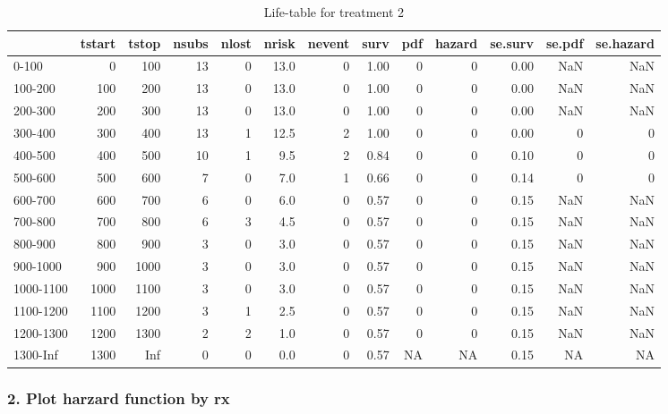 \documentclass[
]{article}
\begin{document}
\begin{table}

\caption{\label{tab:unnamed-chunk-2}Life-table for treatment 2}
\centering
\begin{tabular}[t]{l|r|r|r|r|r|r|r|r|r|r|r|r}
\hline
  & tstart & tstop & nsubs & nlost & nrisk & nevent & surv & pdf & hazard & se.surv & se.pdf & se.hazard\\
\hline
0-100 & 0 & 100 & 13 & 0 & 13.0 & 0 & 1.00 & 0 & 0 & 0.00 & NaN & NaN\\
\hline
100-200 & 100 & 200 & 13 & 0 & 13.0 & 0 & 1.00 & 0 & 0 & 0.00 & NaN & NaN\\
\hline
200-300 & 200 & 300 & 13 & 0 & 13.0 & 0 & 1.00 & 0 & 0 & 0.00 & NaN & NaN\\
\hline
300-400 & 300 & 400 & 13 & 1 & 12.5 & 2 & 1.00 & 0 & 0 & 0.00 & 0 & 0\\
\hline
400-500 & 400 & 500 & 10 & 1 & 9.5 & 2 & 0.84 & 0 & 0 & 0.10 & 0 & 0\\
\hline
500-600 & 500 & 600 & 7 & 0 & 7.0 & 1 & 0.66 & 0 & 0 & 0.14 & 0 & 0\\
\hline
600-700 & 600 & 700 & 6 & 0 & 6.0 & 0 & 0.57 & 0 & 0 & 0.15 & NaN & NaN\\
\hline
700-800 & 700 & 800 & 6 & 3 & 4.5 & 0 & 0.57 & 0 & 0 & 0.15 & NaN & NaN\\
\hline
800-900 & 800 & 900 & 3 & 0 & 3.0 & 0 & 0.57 & 0 & 0 & 0.15 & NaN & NaN\\
\hline
900-1000 & 900 & 1000 & 3 & 0 & 3.0 & 0 & 0.57 & 0 & 0 & 0.15 & NaN & NaN\\
\hline
1000-1100 & 1000 & 1100 & 3 & 0 & 3.0 & 0 & 0.57 & 0 & 0 & 0.15 & NaN & NaN\\
\hline
1100-1200 & 1100 & 1200 & 3 & 1 & 2.5 & 0 & 0.57 & 0 & 0 & 0.15 & NaN & NaN\\
\hline
1200-1300 & 1200 & 1300 & 2 & 2 & 1.0 & 0 & 0.57 & 0 & 0 & 0.15 & NaN & NaN\\
\hline
1300-Inf & 1300 & Inf & 0 & 0 & 0.0 & 0 & 0.57 & NA & NA & 0.15 & NA & NA\\
\hline
\end{tabular}
\end{table}

\hypertarget{plot-harzard-function-by-rx}{%
\subsubsection{2. Plot harzard function by
rx}\label{plot-harzard-function-by-rx}}
\end{document}
